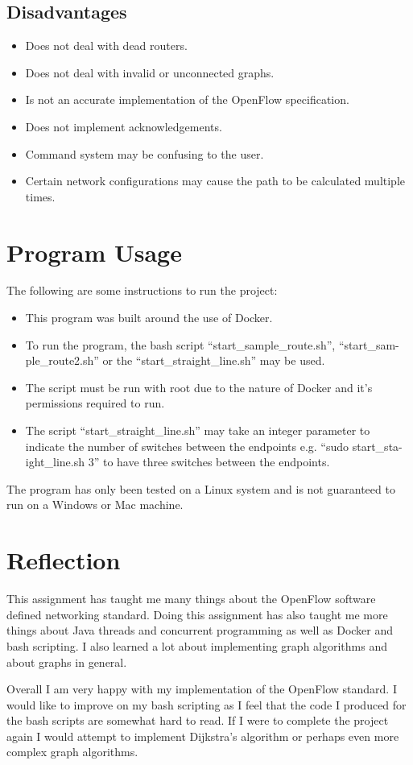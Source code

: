 \documentclass{article}
\begin{document}
\subsection{Disadvantages}
\begin{itemize}
  \item{Does not deal with dead routers.}
  \item{Does not deal with invalid or unconnected graphs.}
  \item{Is not an accurate implementation of the OpenFlow specification.}
  \item{Does not implement acknowledgements.}
  \item{Command system may be confusing to the user.}
  \item{Certain network configurations may cause the path to be calculated
    multiple times.}
\end{itemize}

\section{Program Usage}
The following are some instructions to run the project:
\begin{itemize}
  \item{This program was built around the use of Docker.}
  \item{To run the program, the bash script ``start\_sample\_route.sh'',
    ``start\_sam-\\ple\_route2.sh'' or the ``start\_straight\_line.sh'' may be
  used.}
  \item{The script must be run with root due to the nature of Docker and it's
    permissions required to run.}
  \item{The script ``start\_straight\_line.sh'' may take an integer parameter
    to indicate the number of switches between the endpoints e.g. ``sudo
  start\_sta-\\ight\_line.sh 3'' to have three switches between the endpoints.}
\end{itemize}

The program has only been tested on a Linux system and is not guaranteed to run
on a Windows or Mac machine.

\section{Reflection}
This assignment has taught me many things about the OpenFlow software defined
networking standard. Doing this assignment has also taught me more things about
Java threads and concurrent programming as well as Docker and bash scripting. I
also learned a lot about implementing graph algorithms and about graphs in
general.

Overall I am very happy with my implementation of the OpenFlow standard. I would
like to improve on my bash scripting as I feel that the code I produced for the
bash scripts are somewhat hard to read. If I were to complete the project again
I would attempt to implement Dijkstra's algorithm or perhaps even more complex
graph algorithms.
\end{document}
